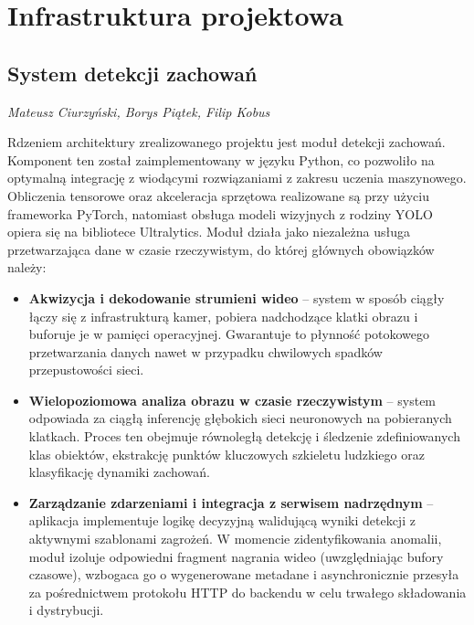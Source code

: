 \section{Infrastruktura projektowa}
% 

\subsection{System detekcji zachowań}

\small \textit{Mateusz Ciurzyński, Borys Piątek, Filip Kobus}

Rdzeniem architektury zrealizowanego projektu jest moduł detekcji zachowań. Komponent ten został zaimplementowany w języku Python, co pozwoliło na optymalną integrację z wiodącymi rozwiązaniami z zakresu uczenia maszynowego. Obliczenia tensorowe oraz akceleracja sprzętowa realizowane są przy użyciu frameworka PyTorch, natomiast obsługa modeli wizyjnych z rodziny YOLO opiera się na bibliotece Ultralytics. Moduł działa jako niezależna usługa przetwarzająca dane w czasie rzeczywistym, do której głównych obowiązków należy:

\begin{itemize}
    \item \textbf{Akwizycja i dekodowanie strumieni wideo} – system w sposób ciągły łączy się z infrastrukturą kamer, pobiera nadchodzące klatki obrazu i buforuje je w pamięci operacyjnej. Gwarantuje to płynność potokowego przetwarzania danych nawet w przypadku chwilowych spadków przepustowości sieci.
    \item \textbf{Wielopoziomowa analiza obrazu w czasie rzeczywistym} – system odpowiada za ciągłą inferencję głębokich sieci neuronowych na pobieranych klatkach. Proces ten obejmuje równoległą detekcję i śledzenie zdefiniowanych klas obiektów, ekstrakcję punktów kluczowych szkieletu ludzkiego oraz klasyfikację dynamiki zachowań.
    \item \textbf{Zarządzanie zdarzeniami i integracja z serwisem nadrzędnym} – aplikacja implementuje logikę decyzyjną walidującą wyniki detekcji z aktywnymi szablonami zagrożeń. W momencie zidentyfikowania anomalii, moduł izoluje odpowiedni fragment nagrania wideo (uwzględniając bufory czasowe), wzbogaca go o wygenerowane metadane i asynchronicznie przesyła za pośrednictwem protokołu HTTP do backendu w celu trwałego składowania i dystrybucji.
\end{itemize}



